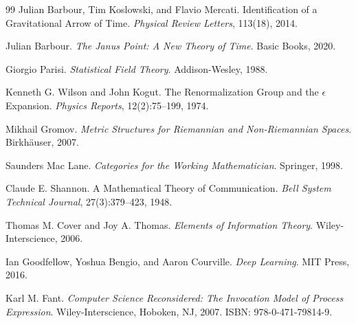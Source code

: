 \documentclass[11pt, a4paper]{article}
\theoremstyle{srn}
\theoremstyle{srnremark}
\begin{document}
\begin{thebibliography}{99}
Julian Barbour, Tim Koslowski, and Flavio Mercati.
\newblock Identification of a Gravitational Arrow of Time.
\newblock \textit{Physical Review Letters}, 113(18), 2014.

Julian Barbour.
\newblock \textit{The Janus Point: A New Theory of Time}.
\newblock Basic Books, 2020.

Giorgio Parisi.
\newblock \textit{Statistical Field Theory}.
\newblock Addison-Wesley, 1988.

Kenneth G. Wilson and John Kogut.
\newblock The Renormalization Group and the $\epsilon$ Expansion.
\newblock \textit{Physics Reports}, 12(2):75--199, 1974.

Mikhail Gromov.
\newblock \textit{Metric Structures for Riemannian and Non-Riemannian Spaces}.
\newblock Birkh\"{a}user, 2007.

Saunders Mac Lane.
\newblock \textit{Categories for the Working Mathematician}.
\newblock Springer, 1998.

Claude E. Shannon.
\newblock A Mathematical Theory of Communication.
\newblock \textit{Bell System Technical Journal}, 27(3):379--423, 1948.

Thomas M. Cover and Joy A. Thomas.
\newblock \textit{Elements of Information Theory}.
\newblock Wiley-Interscience, 2006.

Ian Goodfellow, Yoshua Bengio, and Aaron Courville.
\newblock \textit{Deep Learning}.
\newblock MIT Press, 2016.


Karl M. Fant.
\newblock \textit{Computer Science Reconsidered: The Invocation Model
  of Process Expression}.
\newblock Wiley-Interscience, Hoboken, NJ, 2007.
\newblock ISBN: 978-0-471-79814-9.

\end{thebibliography}
\end{document}
